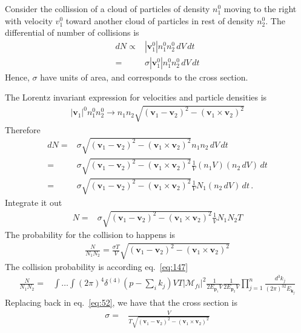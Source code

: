 \begin{borrar}
Consider the collission of a cloud of particles of density $n_1^0$ moving to the right with velocity $v_1^0$ toward another cloud of particles in rest of density $n_2^0$. The differential of number of collisions is
\begin{align}
  d N\propto&|\mathbf{v}_1^0| n_1^0 n_2^0 \,d V\, dt\nonumber\\
  =&\sigma|\mathbf{v}_1^0| n_1^0 n_2^0 \,d V\, dt
\end{align}
Hence,  $\sigma$ have units of area, and corresponds to the cross section. 

The Lorentz invariant expression for velocities and particle densities is
\begin{align}
  |\mathbf{v}_1|^0 n_1^0 n_2^0\to n_1 n_2 \sqrt{(\mathbf{v}_1-\mathbf{v}_2)^2-(\mathbf{v}_1\times\mathbf{v}_2)^2}
\end{align}
Therefore
\begin{align}
  d N =&\sigma\sqrt{(\mathbf{v}_1-\mathbf{v}_2)^2-(\mathbf{v}_1\times\mathbf{v}_2)^2}n_1 n_2 \,d V\, dt  \nonumber\\
  =&\sigma\sqrt{(\mathbf{v}_1-\mathbf{v}_2)^2-(\mathbf{v}_1\times\mathbf{v}_2)^2}\frac{1}{V}(n_1V)(n_2 \,d V)\, dt\nonumber\\
 =&\sigma\sqrt{(\mathbf{v}_1-\mathbf{v}_2)^2-(\mathbf{v}_1\times\mathbf{v}_2)^2}\frac{1}{V}N_1(n_2 \,d V)\, dt\,.
\end{align}
Integrate it out
\begin{align}
  N=&\sigma\sqrt{(\mathbf{v}_1-\mathbf{v}_2)^2-(\mathbf{v}_1\times\mathbf{v}_2)^2}\frac{1}{V}N_1N_2 T
\end{align}
The probability for the collision to happens is
\begin{align}
  \label{eq:52}
  \frac{N}{N_1 N_2}=\frac{\sigma T}{V}\sqrt{(\mathbf{v}_1-\mathbf{v}_2)^2-(\mathbf{v}_1\times\mathbf{v}_2)^2}
\end{align}
The collision probability is according eq.~\eqref{eq:147}
\begin{align}
   \frac{N}{N_1 N_2}
=&\int\ldots\int 
(2\pi)^4\delta^{(4)}\left(p-\sum_i k_j\right)VT 
\left|\mathcal{M}_{fi}\right|^2
\frac{1}{2E_{\mathbf{p}_1}V}\frac{1}{2E_{\mathbf{p}_2}V}
\prod_{j=1}^n\frac{d^3k_j}{(2\pi)^32E_{\mathbf{k}_j}}
\end{align}
Replacing back in eq.~\eqref{eq:52}, we have that the  cross section is
\begin{align}
  \sigma=&\frac{V}{T\sqrt{(\mathbf{v}_1-\mathbf{v}_2)^2-(\mathbf{v}_1\times\mathbf{v}_2)^2}}\nonumber\\

\end{align}
\end{borrar}
